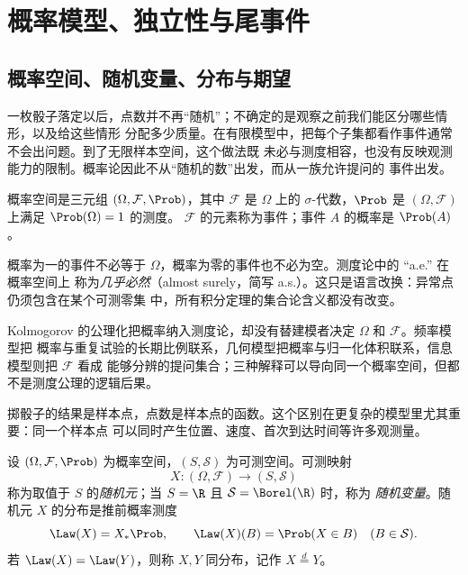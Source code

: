 \section{概率模型、独立性与尾事件}\label{sec:05-01}

\subsection{概率空间、随机变量、分布与期望}\label{subsec:5-1-1}

一枚骰子落定以后，点数并不再“随机”；不确定的是观察之前我们能区分哪些情形，以及给这些情形
分配多少质量。在有限模型中，把每个子集都看作事件通常不会出问题。到了无限样本空间，这个做法既
未必与测度相容，也没有反映观测能力的限制。概率论因此不从“随机的数”出发，而从一族允许提问的
事件出发。

\begin{definition}[概率空间]\label{def:5-1-1-1}
概率空间是三元组 $(\Omega,\mathcal F,\Prob)$，其中 $\mathcal F$ 是 $\Omega$ 上的
$\sigma$-代数，$\Prob$ 是 $(\Omega,\mathcal F)$ 上满足 $\Prob(\Omega)=1$ 的测度。
$\mathcal F$ 的元素称为事件；事件 $A$ 的概率是 $\Prob(A)$。
\end{definition}

概率为一的事件不必等于 $\Omega$，概率为零的事件也不必为空。测度论中的 ``a.e.'' 在概率空间上
称为\emph{几乎必然}（almost surely，简写 a.s.）。这只是语言改换：异常点仍须包含在某个可测零集
中，所有积分定理的集合论含义都没有改变。

Kolmogorov 的公理化把概率纳入测度论，却没有替建模者决定 $\Omega$ 和 $\mathcal F$。频率模型把
概率与重复试验的长期比例联系，几何模型把概率与归一化体积联系，信息模型则把 $\mathcal F$ 看成
能够分辨的提问集合；三种解释可以导向同一个概率空间，但都不是测度公理的逻辑后果。

掷骰子的结果是样本点，点数是样本点的函数。这个区别在更复杂的模型里尤其重要：同一个样本点
可以同时产生位置、速度、首次到达时间等许多观测量。

\begin{definition}\label{def:5-1-1-2}
设 $(\Omega,\mathcal F,\Prob)$ 为概率空间，$(S,\mathcal S)$ 为可测空间。可测映射
\[
  X:(\Omega,\mathcal F)\longrightarrow(S,\mathcal S)
\]
称为取值于 $S$ 的\emph{随机元}；当 $S=\R$ 且 $\mathcal S=\Borel(\R)$ 时，称为
\emph{随机变量}。随机元 $X$ 的分布是推前概率测度
\[
  \Law(X)=X_*\Prob,
  \qquad \Law(X)(B)=\Prob(X\in B)\quad(B\in\mathcal S).
\]
若 $\Law(X)=\Law(Y)$，则称 $X,Y$ 同分布，记作 $X\overset{d}=Y$。
\end{definition}

